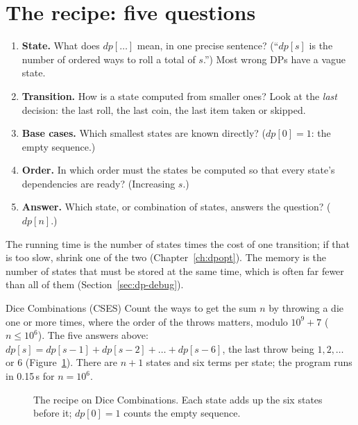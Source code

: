 \section[The recipe]{The recipe: five questions \hfill \gold}\label{sec:dp-recipe}

\begin{enumerate}[label=\textbf{\color{cpteal}\arabic*.}, itemsep=2pt]
  \item \textbf{State.} What does $dp[\dots]$ mean, in one precise sentence? (``$dp[s]$ is the number of ordered ways to roll a total
        of $s$.'') Most wrong DPs have a vague state.
  \item \textbf{Transition.} How is a state computed from smaller ones? Look at the \emph{last} decision: the last roll, the last
        coin, the last item taken or skipped.
  \item \textbf{Base cases.} Which smallest states are known directly? ($dp[0] = 1$: the empty sequence.)
  \item \textbf{Order.} In which order must the states be computed so that every state's dependencies are ready? (Increasing $s$.)
  \item \textbf{Answer.} Which state, or combination of states, answers the question? ($dp[n]$.)
\end{enumerate}

The running time is the number of states times the cost of one transition; if that is too slow, shrink one of the two
(Chapter~\ref{ch:dpopt}). The memory is the number of states that must be stored at the same time, which is often far fewer than
all of them (Section~\ref{sec:dp-debug}).

\begin{problem}{Dice Combinations (CSES)}
Count the ways to get the sum $n$ by throwing a die one or more times, where the order of the throws matters, modulo $10^9 + 7$
($n \le 10^6$).
\solution The five answers above: $dp[s] = dp[s-1] + dp[s-2] + \dots + dp[s-6]$, the last throw being $1, 2, \dots$ or 6
(Figure~\ref{fig:dice}). There are $n + 1$ states and six terms per state; the program runs in 0.15\,s for $n = 10^6$.
\end{problem}

\begin{figure}[htbp]
\centering
{}
\caption{The recipe on Dice Combinations. Each state adds up the six states before it; $dp[0] = 1$ counts the empty sequence.}
\label{fig:dice}
\end{figure}

